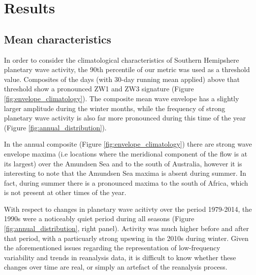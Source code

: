 \section{Results}

\subsection{Mean characteristics}

In order to consider the climatological characteristics of Southern Hemipshere planetary wave activity, the 90th percentile of our metric was used as a threshold value. Composites of the days (with 30-day running mean applied) above that threshold show a pronounced ZW1 and ZW3 signature (Figure \ref{fig:envelope_climatology}). The composite mean wave envelope has a slightly larger amplitude during the winter months, while the frequency of strong planetary wave activity is also far more pronounced during this time of the year (Figure \ref{fig:annual_distribution}).

In the annual composite (Figure \ref{fig:envelope_climatology}) there are strong wave envelope maxima (i.e locations where the meridional component of the flow is at its largest) over the Amundsen Sea and to the south of Australia, however it is interesting to note that the Amundsen Sea maxima is absent during summer. In fact, during summer there is a pronounced maxima to the south of Africa, which is not present at other times of the year.

With respect to changes in planetary wave acitivty over the period 1979-2014, the 1990s were a noticeably quiet period during all seasons (Figure \ref{fig:annual_distribution}, right panel). Activity was much higher before and after that period, with a particuarly strong upswing in the 2010s during winter. Given the aforementioned issues regarding the representation of low-frequency variability and trends in reanalysis data, it is difficult to know whether these changes over time are real, or simply an artefact of the reanalysis process.



